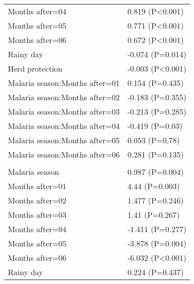 \documentclass[]{article}
\begin{document}
\begin{longtable}[t]{ll}
\hspace{1em}Months after=04 & 0.819 (P<0.001)\\
\hspace{1em}Months after=05 & 0.771 (P<0.001)\\
\hspace{1em}Months after=06 & 0.672 (P<0.001)\\
\hspace{1em}Rainy day & -0.074 (P=0.014)\\
\hspace{1em}Herd protection & -0.003 (P<0.001)\\
\hspace{1em}Malaria season:Months after=01 & 0.154 (P=0.435)\\
\hspace{1em}Malaria season:Months after=02 & -0.183 (P=0.355)\\
\hspace{1em}Malaria season:Months after=03 & -0.213 (P=0.285)\\
\hspace{1em}Malaria season:Months after=04 & -0.419 (P=0.03)\\
\hspace{1em}Malaria season:Months after=05 & 0.053 (P=0.78)\\
\hspace{1em}Malaria season:Months after=06 & 0.281 (P=0.135)\\
\addlinespace[1.5em]
\multicolumn{2}{l}{\textbf{Temporary not field worker}}\\
\hspace{1em}Malaria season & 0.987 (P=0.004)\\
\hspace{1em}Months after=01 & 4.44 (P=0.003)\\
\hspace{1em}Months after=02 & 1.477 (P=0.246)\\
\hspace{1em}Months after=03 & 1.41 (P=0.267)\\
\hspace{1em}Months after=04 & -1.411 (P=0.277)\\
\hspace{1em}Months after=05 & -3.878 (P=0.004)\\
\hspace{1em}Months after=06 & -6.032 (P<0.001)\\
\hspace{1em}Rainy day & 0.224 (P=0.437)\\

\end{longtable}
\end{document}
